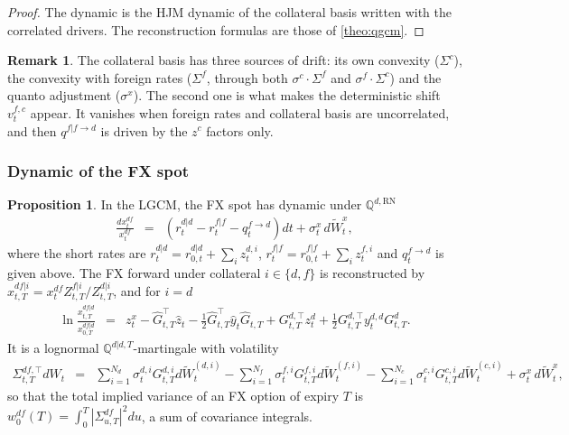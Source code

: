 \documentclass[11pt,english]{amsart}
\newcommand{\RN}{\mathrm{RN}}
\newcommand{\QQ}{\mathbb{Q}}
\theoremstyle{definition}
\newtheorem{prop}{Proposition}
\newtheorem{rema}{Remark}
\begin{document}
\begin{proof}
The dynamic is the HJM dynamic of the collateral basis written with the correlated drivers. The reconstruction formulas are those of \autoref{theo:qgcm}.
\end{proof}

\begin{rema}
The collateral basis has three sources of drift: its own convexity ($\Sigma^c$), the convexity with foreign rates ($\Sigma^f$, through both $\sigma^c\cdot\Sigma^f$ and $\sigma^f\cdot\Sigma^c$) and the quanto adjustment ($\sigma^x$). The second one is what makes the deterministic shift $v^{f,c}_t$ appear. It vanishes when foreign rates and collateral basis are uncorrelated, and then $q^{f|f\to d}$ is driven by the $z^{c}$ factors only.
\end{rema}



\subsubsection{Dynamic of the FX spot}%

\begin{prop}
In the LGCM, the FX spot has dynamic under $\QQ^{d,\RN}$
\begin{eqnarray}
  \frac{dx^{df}_t}{x^{df}_t} &=& \left( r^{d|d}_t - r^{f|f}_t - q^{f\to d}_t \right) dt + \sigma^x_t \, d\widetilde{W}^x_t ,
\end{eqnarray}
where the short rates are $r^{d|d}_t = r^{d|d}_{0,t} + \sum_i z^{d,i}_t$, $r^{f|f}_t = r^{f|f}_{0,t} + \sum_i z^{f,i}_t$ and $q^{f\to d}_t$ is given above. The FX forward under collateral $i\in\{d,f\}$ is reconstructed by $x^{df|i}_{t,T} = x^{df}_t Z^{f|i}_{t,T}/Z^{d|i}_{t,T}$, and for $i = d$
\begin{eqnarray}
  \ln \frac{x^{df|d}_{t,T}}{x^{df|d}_{0,T}} &=& z^x_t - \hat{G}^{\top}_{t,T} \hat{z}_t - \frac{1}{2} \hat{G}^{\top}_{t,T}  \hat{y}_t \hat{G}_{t,T}  +  G^{d,\top}_{t,T} z^{d}_t + \frac{1}{2} G^{d,\top}_{t,T}  y^{d,d}_t G^{d}_{t,T} .
\end{eqnarray}
It is a lognormal $\QQ^{d|d,T}$-martingale with volatility
\begin{eqnarray}
  \Sigma^{df,\top}_{t,T} dW_t &=& \sum_{i=1}^{N_d}\sigma^{d,i}_tG^{d,i}_{t,T}d\widetilde{W}^{(d,i)}_t - \sum_{i=1}^{N_f}\sigma^{f,i}_tG^{f,i}_{t,T}d\widetilde{W}^{(f,i)}_t - \sum_{i=1}^{N_c}\sigma^{c,i}_tG^{c,i}_{t,T}d\widetilde{W}^{(c,i)}_t + \sigma^x_t\,d\widetilde{W}^x_t ,
\end{eqnarray}
so that the total implied variance of an FX option of expiry $T$ is $w^{df}_0(T) = \int_0^T|\Sigma^{df}_{u,T}|^2du$, a sum of covariance integrals.
\end{prop}
\end{document}
